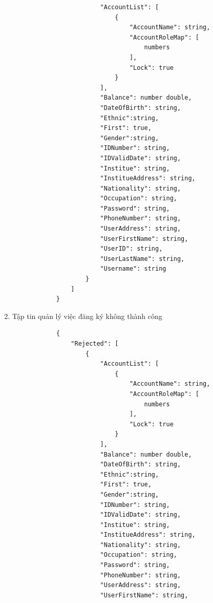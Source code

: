 \documentclass[12pt,a4paper]{report}
\begin{document}
\begin{enumerate}
\begin{verbatim}
                        "AccountList": [
                            {
                                "AccountName": string,
                                "AccountRoleMap": [
                                    numbers
                                ],
                                "Lock": true
                            }
                        ],
                        "Balance": number double,
                        "DateOfBirth": string,
                        "Ethnic":string,
                        "First": true,
                        "Gender":string,
                        "IDNumber": string,
                        "IDValidDate": string,
                        "Institue": string,
                        "InstitueAddress": string,
                        "Nationality": string,
                        "Occupation": string,
                        "Password": string,
                        "PhoneNumber": string,
                        "UserAddress": string,
                        "UserFirstName": string,
                        "UserID": string,
                        "UserLastName": string,
                        "Username": string
                    }
                ]
            }
            \end{verbatim}
            \newpage
            \item Tập tin quản lý việc đăng ký không thành công
            \begin{verbatim}
            {
                "Rejected": [
                    {
                        "AccountList": [
                            {
                                "AccountName": string,
                                "AccountRoleMap": [
                                    numbers
                                ],
                                "Lock": true
                            }
                        ],
                        "Balance": number double,
                        "DateOfBirth": string,
                        "Ethnic":string,
                        "First": true,
                        "Gender":string,
                        "IDNumber": string,
                        "IDValidDate": string,
                        "Institue": string,
                        "InstitueAddress": string,
                        "Nationality": string,
                        "Occupation": string,
                        "Password": string,
                        "PhoneNumber": string,
                        "UserAddress": string,
                        "UserFirstName": string,

\end{verbatim}
\end{enumerate}
\end{document}
